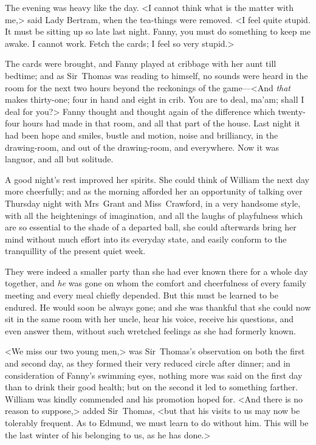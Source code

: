 The evening was heavy like the day. <I cannot think what is the matter with me,> said Lady Bertram, when the tea-things were removed. <I feel quite stupid. It must be sitting up so late last night. Fanny, you must do something to keep me awake. I cannot work. Fetch the cards; I feel so very stupid.>

The cards were brought, and Fanny played at cribbage with her aunt till bedtime; and as Sir~Thomas was reading to himself, no sounds were heard in the room for the next two hours beyond the reckonings of the game—<And \textit{that}  makes thirty-one; four in hand and eight in crib. You are to deal, ma'am; shall I deal for you?> Fanny thought and thought again of the difference which twenty-four hours had made in that room, and all that part of the house. Last night it had been hope and smiles, bustle and motion, noise and brilliancy, in the drawing-room, and out of the drawing-room, and everywhere. Now it was languor, and all but solitude.

A good night's rest improved her spirits. She could think of William the next day more cheerfully; and as the morning afforded her an opportunity of talking over Thursday night with Mrs~Grant and Miss~Crawford, in a very handsome style, with all the heightenings of imagination, and all the laughs of playfulness which are so essential to the shade of a departed ball, she could afterwards bring her mind without much effort into its everyday state, and easily conform to the tranquillity of the present quiet week.

They were indeed a smaller party than she had ever known there for a whole day together, and \textit{he}  was gone on whom the comfort and cheerfulness of every family meeting and every meal chiefly depended. But this must be learned to be endured. He would soon be always gone; and she was thankful that she could now sit in the same room with her uncle, hear his voice, receive his questions, and even answer them, without such wretched feelings as she had formerly known.

<We miss our two young men,> was Sir~Thomas's observation on both the first and second day, as they formed their very reduced circle after dinner; and in consideration of Fanny's swimming eyes, nothing more was said on the first day than to drink their good health; but on the second it led to something farther. William was kindly commended and his promotion hoped for. <And there is no reason to suppose,> added Sir~Thomas, <but that his visits to us may now be tolerably frequent. As to Edmund, we must learn to do without him. This will be the last winter of his belonging to us, as he has done.>

